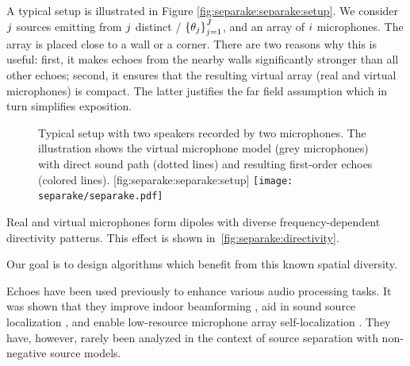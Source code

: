 \mynewline
A typical setup is illustrated in Figure \ref{fig:separake:separake:setup}.
We consider $j$ sources emitting from $j$ distinct \DOAdef/ $\set{\theta_\idxSrc}_{\idxSrc=1}^{\numSrcs}$, and an array of $i$ microphones.
The array is placed close to a wall or a corner.
There are two reasons why this is useful:
first, it makes echoes from the nearby walls significantly stronger than all other echoes;
second, it ensures that the resulting virtual array (real and virtual microphones) is compact.
The latter justifies the far field assumption which in turn simplifies exposition.

\begin{figure}[h]
    \begin{sidecaption}{%
        Typical setup with two speakers recorded by two microphones.
        The illustration shows the virtual microphone model (grey microphones) with direct sound path (dotted lines) and resulting first-order echoes (colored lines).
        }[fig:separake:separake:setup]
    \centering
    \texttt{[image: separake/separake.pdf]}
    \end{sidecaption}
\end{figure}


\noindent Real and virtual microphones form dipoles with diverse frequency-dependent directivity patterns.
This effect is shown in~\cref{fig:separake:directivity}.
\begin{figure}[h]
    \begin{fullwidth}
    \centering
        \hfill
    \label{fig:separake:results}
    \end{fullwidth}
\end{figure}
Our goal is to design algorithms which benefit from this known spatial diversity.

\mynewline
Echoes have been used previously to enhance various audio processing tasks.
It was shown that they improve indoor beamforming ,
aid in sound source localization ,
and enable low-resource microphone array self-localization .
They have, however, rarely been analyzed in the context of source separation with non-negative source models.

